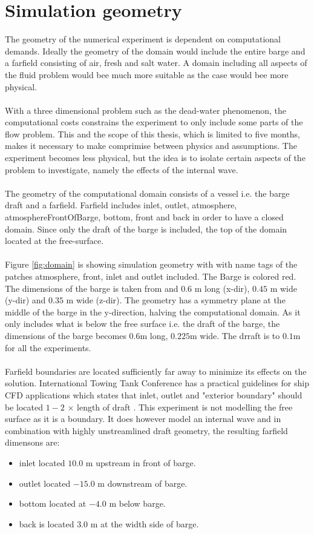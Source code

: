 \documentclass[a4paper, 12pt]{report}
\begin{document}
\section{Simulation geometry}
The geometry of the numerical experiment is dependent on computational demands. Ideally the geometry of the domain would include the entire barge and a farfield consisting of air, fresh and salt water. A domain including all aspects of the fluid problem would bee much more suitable as the case would bee more physical.\\
\\
With a three dimensional problem such as the dead-water phenomenon, the computational costs constrains the experiment to only include some parts of the flow problem. This and the scope of this thesis, which is limited to five months, makes it necessary to make comprimise between physics and assumptions. The experiment becomes less physical, but the idea is to isolate certain aspects of the problem to investigate, namely the effects of the internal wave.\\
\\
The geometry of the computational domain consists of a vessel i.e. the barge draft and a farfield. Farfield includes inlet, outlet, atmosphere, atmosphereFrontOfBarge, bottom, front and back in order to have a closed domain. Since only the draft of the barge is included, the top of the domain located at the free-surface.\\
\\
Figure \ref{fig:domain} is showing simulation geometry with with name tags of the patches atmosphere, front, inlet and outlet included. The Barge is colored red. The dimensions of the barge is taken from \cite{Gou} and $0.6$ m long (x-dir), $0.45$ m wide (y-dir) and $0.35$ m wide (z-dir).  The geometry has a symmetry plane at the middle of the barge in the y-direction, halving the computational domain. As it only includes what is below the free surface i.e. the draft of the barge, the dimensions of the barge becomes $0.6$m long, $0.225$m wide. The drraft is to $0.1$m for all the experiments.\\
\\
Farfield boundaries are located sufficiently far away to minimize its effects on the solution. International Towing Tank Conference has a practical guidelines for ship CFD applications which states that inlet, outlet and "exterior boundary" should be located $1-2$ $\times$ length of draft \cite{ITTC}. This experiment is not modelling the free surface as it is a boundary. It does however model an internal wave and in combination with highly unstreamlined draft geometry, the resulting farfield dimensons are:
\begin{itemize}
\item inlet located $10.0$ m upstream in front of barge.
\item outlet located $-15.0$ m downstream of barge.
\item bottom located at $-4.0$ m below barge.
\item back is located $3.0$ m at the width side of barge.
\end{itemize}
\end{document}
